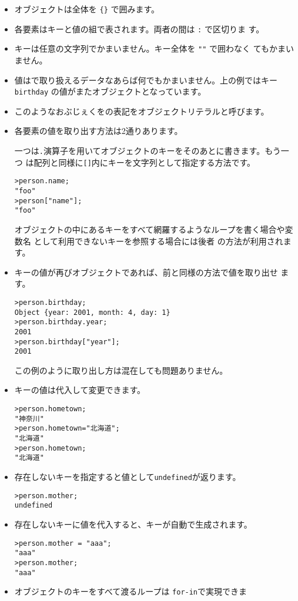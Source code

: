 \begin{itemize}
 \item オブジェクトは全体を \Verb+{}+ で囲みます。
 \item 各要素はキーと値の組で表されます。両者の間は \Verb+:+ で区切りま
			 す。
 \item キーは任意の文字列でかまいません。キー全体を \Verb+""+ で囲わなく
			 てもかまいません。
 \item 値は\JS で取り扱えるデータなあらば何でもかまいません。上の例ではキー
       \Verb+birthday+ の値がまたオブジェクトとなっています。
 \item このようなおぶじぇくをの表記をオブジェクトリテラルと呼びます。
 \item 各要素の値を取り出す方法は2通りあります。

一つは\Verb+.+演算子を用いてオブジェクトのキーをそのあとに書きます。もう一つ
       は配列と同様に\Verb+[]+内にキーを文字列として指定する方法です。
\begin{Verbatim}
>person.name;
"foo"
>person["name"];
"foo"
\end{Verbatim}
オブジェクトの中にあるキーをすべて網羅するようなループを書く場合や変数名
       として利用できないキーを参照する場合には後者
       の方法が利用されます。
 \item キーの値が再びオブジェクトであれば、前と同様の方法で値を取り出せ
       ます。
\begin{Verbatim}[fontsize=\small]
>person.birthday;
Object {year: 2001, month: 4, day: 1}
>person.birthday.year;
2001
>person.birthday["year"];
2001
\end{Verbatim}
この例のように取り出し方は混在しても問題ありません。
 \item キーの値は代入して変更できます。
\begin{Verbatim}[fontsize=\small]
>person.hometown;
"神奈川"
>person.hometown="北海道";
"北海道"
>person.hometown;
"北海道"
\end{Verbatim}
 \item 存在しないキーを指定すると値として\Verb+undefined+が返ります。
\begin{Verbatim}[fontsize=\small]
>person.mother;
undefined
\end{Verbatim}
 \item 存在しないキーに値を代入すると、キーが自動で生成されます。
\begin{Verbatim}[fontsize=\small]
>person.mother = "aaa";
"aaa"
>person.mother;
"aaa"
\end{Verbatim}
 \item オブジェクトのキーをすべて渡るループは \verb+for-in+で実現できま

\end{itemize}
